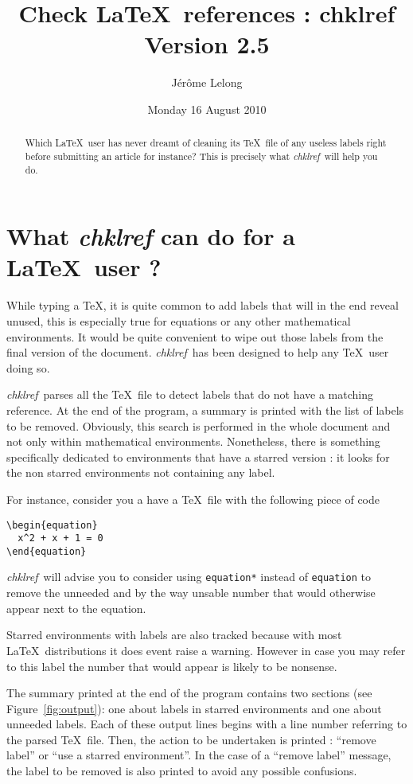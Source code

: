 \documentclass[a4paper,11pt,twoside]{article}
\title{Check \LaTeX\ references : chklref \\
Version 2.5}
\date{Monday 16 August 2010}
\author{J\'er\^ome Lelong}
\def\chk{{\it chklref}}
\def\page{}%
\def\page{\HCode{<div id='page'>}}%
\begin{document}
\page
\maketitle

\begin{abstract} Which \LaTeX\ user has never dreamt of cleaning its \TeX\ file
  of any useless labels right before submitting an article for instance? This is
  precisely what \chk\ will help you do.
\end{abstract}

\section{What {\it chklref} can do for a \LaTeX\ user ?}

While typing a \TeX, it is quite common to add labels that will in the end
reveal unused, this is especially true for equations or any other mathematical
environments. It would be quite convenient to wipe out those labels from the
final version of the document. \chk\ has been designed to help any \TeX\
user doing so.

\chk\ parses all the \TeX\ file to detect labels that do not have a matching
reference. At the end of the program, a summary is printed with the list of
labels to be removed. Obviously, this search is performed in the whole document
and not only within mathematical environments. Nonetheless, there is something
specifically dedicated to environments that have a starred version : it looks
for the non starred environments not containing any label.

For instance, consider you a have a \TeX\ file with the following piece of code
\begin{verbatim}
\begin{equation}
  x^2 + x + 1 = 0
\end{equation}
\end{verbatim}
\chk\ will advise you to consider using \verb!equation*! instead of
\verb!equation! to remove the unneeded and by the way unsable number that would
otherwise appear next to the equation.

Starred environments with labels are also tracked because with most \LaTeX\
distributions it does event raise a warning. However in case you may refer to
this label the number that would appear is likely to be nonsense.

The summary printed at the end of the program contains two sections (see
Figure~\ref{fig:output}): one about labels in starred environments and one about
unneeded labels. Each of these output lines begins with a line number referring
to the parsed \TeX\ file. Then, the action to be undertaken is printed :
``remove label'' or ``use a starred environment''. In the case of a ``remove
label'' message, the label to be removed is also printed to avoid any possible
confusions.
\end{document}
